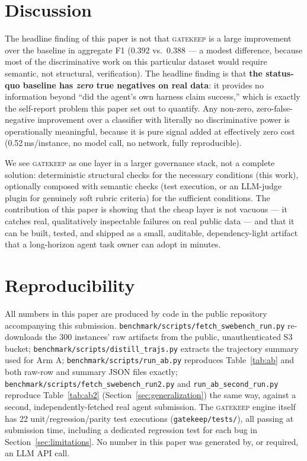 \documentclass{article}
\begin{document}
\section{Discussion}

The headline finding of this paper is not that \textsc{gatekeep} is a
large improvement over the baseline in aggregate F1 (0.392 vs.\ 0.388 ---
a modest difference, because most of the discriminative work on this
particular dataset would require semantic, not structural, verification).
The headline finding is that \textbf{the status-quo baseline has
\emph{zero} true negatives on real data}: it provides no information
beyond ``did the agent's own harness claim success,'' which is exactly the
self-report problem this paper set out to quantify. Any non-zero,
zero-false-negative improvement over a classifier with literally no
discriminative power is operationally meaningful, because it is pure
signal added at effectively zero cost (0.52\,ms/instance, no model call,
no network, fully reproducible).

We see \textsc{gatekeep} as one layer in a larger governance stack, not a
complete solution: deterministic structural checks for the necessary
conditions (this work), optionally composed with semantic checks (test
execution, or an LLM-judge plugin for genuinely soft rubric criteria) for
the sufficient conditions. The contribution of this paper is showing that
the cheap layer is not vacuous --- it catches real, qualitatively
inspectable failures on real public data --- and that it can be built,
tested, and shipped as a small, auditable, dependency-light artifact that
a long-horizon agent task owner can adopt in minutes.

\section{Reproducibility}

All numbers in this paper are produced by code in the public repository
accompanying this submission. \texttt{benchmark/scripts/fetch\_swebench\_run.py}
re-downloads the 300 instances' raw artifacts from the public,
unauthenticated S3 bucket; \texttt{benchmark/scripts/distill\_trajs.py}
extracts the trajectory summary used for Arm A;
\texttt{benchmark/scripts/run\_ab.py} reproduces Table~\ref{tab:ab} and
both raw-row and summary JSON files exactly;
\texttt{benchmark/scripts/fetch\_swebench\_run2.py} and
\texttt{run\_ab\_second\_run.py} reproduce Table~\ref{tab:ab2}
(Section~\ref{sec:generalization}) the same way, against a second,
independently-fetched real agent submission. The \textsc{gatekeep} engine
itself has 22 unit/regression/parity test executions
(\texttt{gatekeep/tests/}), all passing at submission time, including a
dedicated regression test for each bug in Section~\ref{sec:limitations}.
No number in this paper was generated by, or required, an LLM API call.
\end{document}
